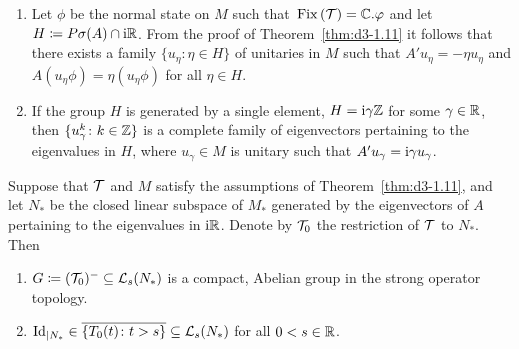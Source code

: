 \begin{remarks}\label{rem:d3-1.12}
\begin{enumerate}[\upshape (i), wide, labelindent=.25em]

\item 
Let $\phi$ be the normal state on $M$ such that 
$\Fix{\TT} = \C.\phi$ and let $H \coloneq P\sigma(A) \cap \mathrm{i}\mathbb{R}$.
From the proof of Theorem~\ref{thm:d3-1.11} it follows that there exists a family $\{u_{\eta} \colon \eta \in H\}$ of unitaries in $M$ such that $A'u_{\eta} = -\eta u_{\eta}$ and $A(u_{\eta}\phi) = \eta(u_{\eta}\phi)$ for all $\eta \in H$.

\item 
If the group $H$ is generated by a single element, \ie $H = \mathrm{i}\gamma\mathbb{Z}$ for some $\gamma \in \mathbb{R}$, then 
$\{u_{\gamma}^{k} \colon k \in \mathbb{Z}\}$ 
is a complete family of eigenvectors pertaining to the eigenvalues in $H$, where $u_{\gamma} \in M$ is unitary such that $A'u_{\gamma} = \mathrm{i}\gamma u_{\gamma}$.

\end{enumerate}
\end{remarks}
\begin{proposition}\label{prop:d3-1.13}
Suppose that $\mathcal{T}$ and $M$ satisfy the assumptions of Theorem~\ref{thm:d3-1.11}, and let $N_{*}$ be the closed linear subspace of\/ $M_{*}$ generated by the eigenvectors of\/ $A$ pertaining to the eigenvalues in $\mathrm{i}\mathbb{R}$.
Denote by $\mathcal{T}_{0}$ the restriction of\/ $\mathcal{T}$ to $N_{*}$.
Then
\begin{enumerate}[\upshape (i)]
 
\item 
$G \coloneq (\mathcal{T}_{0})^{-} \subseteq \mathcal{L}_{s}(N_{*})$ is a compact, Abelian group in the strong operator topology.

\item 
$\operatorname{Id}_{| N_{{*}}} \in \overline{\{T_{0}(t) \colon t>s\}} \subseteq \mathcal{L}_{s}(N_{*})$ for all $0<s \in \mathbb{R}$.
\end{enumerate}
\end{proposition}
